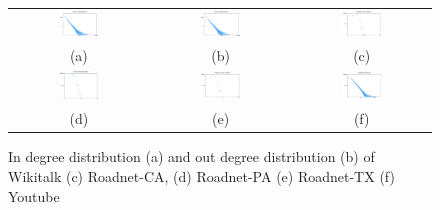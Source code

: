 \begin{figure}[!htbf]
\begin{center}
\begin{tabular}{c c c}
     \includegraphics[width=0.3\textwidth]{FIG/t1_wiki_in.png} &
     \includegraphics[width=0.3\textwidth]{FIG/t1_wiki_out.png} & 
     \includegraphics[width=0.3\textwidth]{FIG/t1_ca.png}\\
    (a) & (b) & (c) \\
     \includegraphics[width=0.3\textwidth]{FIG/t1_pa.png} & 
     \includegraphics[width=0.3\textwidth]{FIG/t1_tx.png} & 
     \includegraphics[width=0.3\textwidth]{FIG/t1_youtube.png} \\
     (d) & (e) & (f) \\
\end{tabular}
\caption{In degree distribution (a) and out degree distribution (b) of Wikitalk (c) Roadnet-CA, (d) Roadnet-PA (e) Roadnet-TX (f) Youtube}
\label{t1:plot}
\end{center}
\end{figure}


